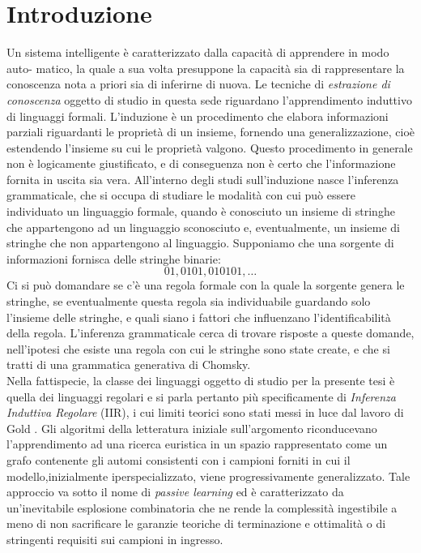 
\chapter*{Introduzione} %
\label{cap:intro}

Un sistema intelligente è caratterizzato dalla capacità di apprendere in modo auto-
matico, la quale a sua volta presuppone la capacità sia di rappresentare la conoscenza
nota a priori sia di inferirne di nuova. Le tecniche di \textit{estrazione di conoscenza} oggetto di studio  in questa sede riguardano l'apprendimento induttivo di linguaggi formali. L’induzione è un procedimento che elabora informazioni parziali riguardanti le proprietà di un insieme, fornendo una generalizzazione, cioè estendendo l’insieme su cui le proprietà valgono. Questo procedimento in generale non è logicamente giustificato, e di conseguenza non è certo che l’informazione fornita in uscita sia vera. All’interno degli studi sull’induzione nasce l’inferenza grammaticale, che si occupa di studiare le modalità con cui può essere individuato un linguaggio formale, quando è conosciuto un insieme di stringhe che appartengono ad un linguaggio sconosciuto e, eventualmente, un insieme di stringhe che non appartengono al linguaggio. Supponiamo che una sorgente di informazioni fornisca delle stringhe binarie: 
\begin{equation*}
    01, 0101, 010101, \dots
\end{equation*}
Ci si può domandare se c’è una regola formale con la quale la sorgente genera le stringhe, se eventualmente questa regola sia individuabile guardando solo l’insieme delle stringhe, e quali siano i fattori che influenzano l’identificabilità della regola. L’inferenza grammaticale cerca di trovare risposte a queste domande, nell’ipotesi che esiste una regola con cui le stringhe sono state create, e che si tratti di una grammatica generativa di Chomsky. \\
Nella fattispecie, la classe dei linguaggi oggetto di studio per la presente tesi è quella dei linguaggi regolari e si parla pertanto più specificamente di \textit{Inferenza Induttiva Regolare} (IIR), i cui limiti teorici sono stati messi in luce dal lavoro di Gold \cite{Gold67}. Gli algoritmi della letteratura iniziale sull’argomento riconducevano l’apprendimento ad una ricerca euristica in un spazio rappresentato come un grafo contenente gli automi consistenti con i campioni forniti in cui il modello,inizialmente iperspecializzato, viene progressivamente generalizzato. Tale approccio va sotto il nome di \textit{passive learning} ed è caratterizzato da un’inevitabile esplosione combinatoria che ne rende la complessità ingestibile a meno di non sacrificare le garanzie teoriche di terminazione e ottimalità o di stringenti requisiti sui campioni in ingresso.


